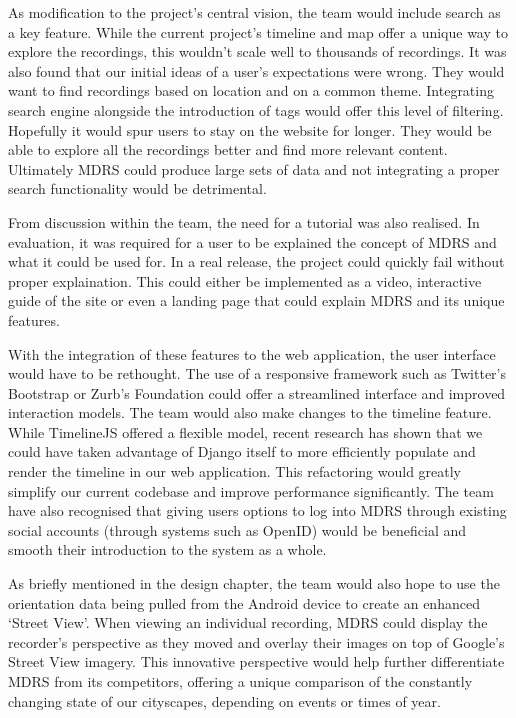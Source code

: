 \documentclass{l3proj}
\begin{document}
As modification to the project's central vision, the team would include search as a key feature. While the current project's timeline and map offer a unique way to explore the recordings, this wouldn't scale well to thousands of recordings. It was also found that our initial ideas of a user's expectations were wrong. They would want to find recordings based on location and on a common theme. Integrating search engine alongside the introduction of tags would offer this level of filtering. Hopefully it would spur users to stay on the website for longer. They would be able to explore all the recordings better and find more relevant content. Ultimately MDRS could produce large sets of data and not integrating a proper search functionality would be detrimental.

From discussion within the team, the need for a tutorial was also realised. In evaluation, it was required for a user to be explained the concept of MDRS and what it could be used for. In a real release, the project could quickly fail without proper explaination. This could either be implemented as a video, interactive guide of the site or even a landing page that could explain MDRS and its unique features.

With the integration of these features to the web application, the user interface would have to be rethought. The use of a responsive framework such as Twitter's Bootstrap or Zurb's Foundation could offer a streamlined interface and improved interaction models. The team would also make changes to the timeline feature. While TimelineJS offered a flexible model, recent research has shown that we could have taken advantage of Django itself to more efficiently populate and render the timeline in our web application. This refactoring would greatly simplify our current codebase and improve performance significantly. The team have also recognised that giving users options to log into MDRS through existing social accounts (through systems such as OpenID) would be beneficial and smooth their introduction to the system as a whole.

As briefly mentioned in the design chapter, the team would also hope to use the orientation data being pulled from the Android device to create an enhanced ‘Street View’. When viewing an individual recording, MDRS could display the recorder’s perspective as they moved and overlay their images on top of Google’s Street View imagery. This innovative perspective would help further differentiate MDRS from its competitors, offering a unique comparison of the constantly changing state of our cityscapes, depending on events or times of year.
\end{document}
